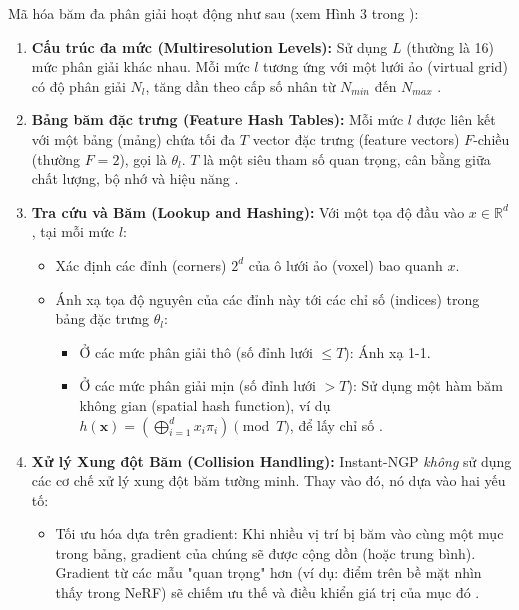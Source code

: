 Mã hóa băm đa phân giải hoạt động như sau (xem Hình 3 trong \cite{Muller2022InstantNGP}):
\begin{enumerate}
    \item \textbf{Cấu trúc đa mức (Multiresolution Levels):} Sử dụng $L$ (thường là 16) mức phân giải khác nhau. Mỗi mức $l$ tương ứng với một lưới ảo (virtual grid) có độ phân giải $N_l$, tăng dần theo cấp số nhân từ $N_{min}$ đến $N_{max}$ \cite{Muller2022InstantNGP_source_112, Muller2022InstantNGP_source_113, Muller2022InstantNGP_source_114}.
    \item \textbf{Bảng băm đặc trưng (Feature Hash Tables):} Mỗi mức $l$ được liên kết với một bảng (mảng) chứa tối đa $T$ vector đặc trưng (feature vectors) $F$-chiều (thường $F=2$), gọi là $\theta_l$. $T$ là một siêu tham số quan trọng, cân bằng giữa chất lượng, bộ nhớ và hiệu năng \cite{Muller2022InstantNGP_source_105, Muller2022InstantNGP_source_112, Muller2022InstantNGP_source_125}.
    \item \textbf{Tra cứu và Băm (Lookup and Hashing):} Với một tọa độ đầu vào $x \in \mathbb{R}^d$, tại mỗi mức $l$:
        \begin{itemize}
            \item Xác định các đỉnh (corners) $2^d$ của ô lưới ảo (voxel) bao quanh $x$.
            \item Ánh xạ tọa độ nguyên của các đỉnh này tới các chỉ số (indices) trong bảng đặc trưng $\theta_l$:
                \begin{itemize}
                    \item Ở các mức phân giải thô (số đỉnh lưới $\le T$): Ánh xạ 1-1.
                    \item Ở các mức phân giải mịn (số đỉnh lưới $> T$): Sử dụng một hàm băm không gian (spatial hash function), ví dụ $h(\mathbf{x}) = (\bigoplus_{i=1}^d x_i \pi_i) \pmod T$, để lấy chỉ số \cite{Muller2022InstantNGP_source_104, Muller2022InstantNGP_source_117, Muller2022InstantNGP_source_118, Muller2022InstantNGP_source_121, Teschner2003SpatialHashing}.
                \end{itemize}
        \end{itemize}
    \item \textbf{Xử lý Xung đột Băm (Collision Handling):} Instant-NGP \textit{không} sử dụng các cơ chế xử lý xung đột băm tường minh. Thay vào đó, nó dựa vào hai yếu tố:
        \begin{itemize}
            \item Tối ưu hóa dựa trên gradient: Khi nhiều vị trí bị băm vào cùng một mục trong bảng, gradient của chúng sẽ được cộng dồn (hoặc trung bình). Gradient từ các mẫu "quan trọng" hơn (ví dụ: điểm trên bề mặt nhìn thấy trong NeRF) sẽ chiếm ưu thế và điều khiển giá trị của mục đó \cite{Muller2022InstantNGP_source_34, Muller2022InstantNGP_source_150, Muller2022InstantNGP_source_153}.

\end{itemize}
\end{enumerate}
